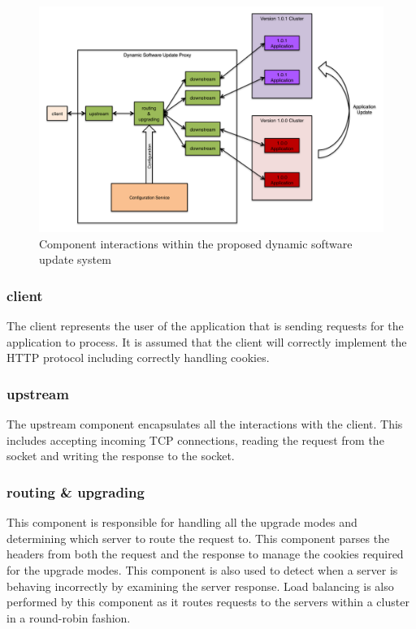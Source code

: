 \documentclass[a4paper,11pt,twoside]{report}
\begin{document}
\begin{figure}[!ht]
  \centering
     \includegraphics[scale=0.31]{proposed_solution}
  \caption{Component interactions within the proposed  dynamic software update system}
  \label{proposed_solution}
\end{figure}

\subsubsection*{client}
The client represents the user of the application that is sending requests for the application to process. It is assumed that the client will correctly implement the HTTP protocol including correctly handling cookies.

\subsubsection*{upstream}
The upstream component encapsulates all the interactions with the client.  This includes accepting incoming TCP connections, reading the request from the socket and writing the response to the socket.

\subsubsection*{routing \& upgrading}
This component is responsible for handling all the upgrade modes and determining which server to route the request to.  This component parses the headers from both the request and the response to manage the cookies required for the upgrade modes.  This component is also used to detect when a server is behaving incorrectly by examining the server response.  Load balancing is also performed by this component as it routes requests to the servers within a cluster in a round-robin fashion.
\end{document}
